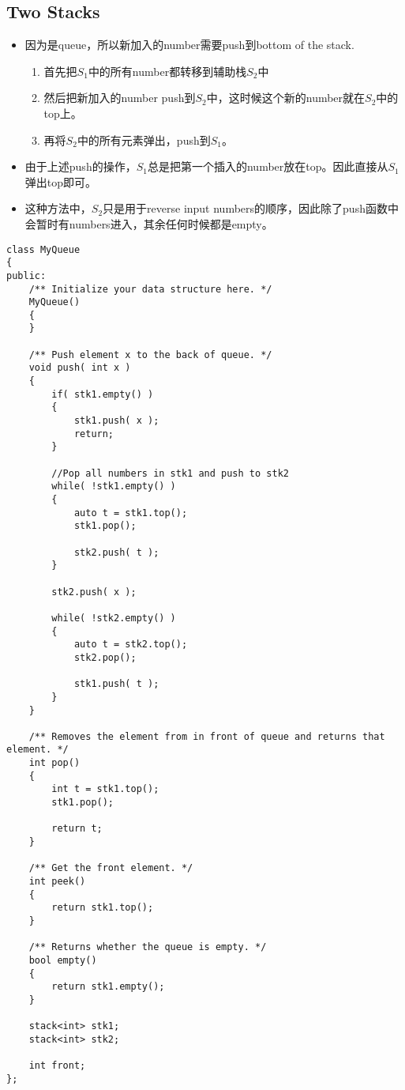 \subsection{Two Stacks}
\begin{CJK*}{UTF8}{gbsn}
\begin{itemize}
\item 因为是queue，所以新加入的number需要push到bottom of the stack.
\begin{enumerate}
\item 首先把$S_1$中的所有number都转移到辅助栈$S_2中$
\item 然后把新加入的number push到$S_2$中，这时候这个新的number就在$S_2$中的top上。
\item 再将$S_2$中的所有元素弹出，push到$S_1$。
\end{enumerate}
\item 由于上述push的操作，$S_1$总是把第一个插入的number放在top。因此直接从$S_1$弹出top即可。
\item 这种方法中，$S_2$只是用于reverse input numbers的顺序，因此除了push函数中会暂时有numbers进入，其余任何时候都是empty。
\end{itemize}
\end{CJK*}
\setcounter{lstlisting}{0}
\begin{lstlisting}[style=customc,caption={Two Stacks}]
class MyQueue
{
public:
    /** Initialize your data structure here. */
    MyQueue()
    {
    }

    /** Push element x to the back of queue. */
    void push( int x )
    {
        if( stk1.empty() )
        {
            stk1.push( x );
            return;
        }

        //Pop all numbers in stk1 and push to stk2
        while( !stk1.empty() )
        {
            auto t = stk1.top();
            stk1.pop();

            stk2.push( t );
        }

        stk2.push( x );

        while( !stk2.empty() )
        {
            auto t = stk2.top();
            stk2.pop();

            stk1.push( t );
        }
    }

    /** Removes the element from in front of queue and returns that element. */
    int pop()
    {
        int t = stk1.top();
        stk1.pop();

        return t;
    }

    /** Get the front element. */
    int peek()
    {
        return stk1.top();
    }

    /** Returns whether the queue is empty. */
    bool empty()
    {
        return stk1.empty();
    }

    stack<int> stk1;
    stack<int> stk2;

    int front;
};
\end{lstlisting}
